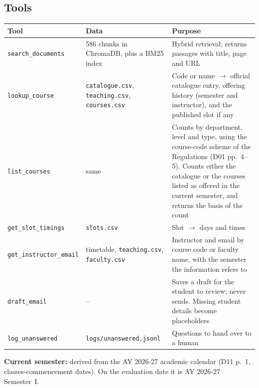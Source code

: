 \documentclass[11pt,a4paper]{article}
\newcommand{\code}[1]{\texttt{#1}}
\begin{document}
\subsection{Tools}
\begin{tabularx}{\textwidth}{@{}lp{3.4cm}Y@{}}
\toprule
Tool & Data & Purpose \\ \midrule
\code{search\_documents} & 586 chunks in ChromaDB, plus a BM25 index & Hybrid retrieval; returns passages with title, page and URL \\
\code{lookup\_course} & \code{catalogue.csv}, \code{teaching.csv}, \code{courses.csv} & Code or name $\rightarrow$ official catalogue entry, offering history (semester and instructor), and the published slot if any \\
\code{list\_courses} & same & Counts by department, level and type, using the course-code scheme of the Regulations (D01 pp.~4--5). Counts either the catalogue or the courses listed as offered in the current semester, and returns the basis of the count \\
\code{get\_slot\_timings} & \code{slots.csv} & Slot $\rightarrow$ days and times \\
\code{get\_instructor\_email} & timetable, \code{teaching.csv}, \code{faculty.csv} & Instructor and email by course code or faculty name, with the semester the information refers to \\
\code{draft\_email} & -- & Saves a draft for the student to review; never sends. Missing student details become placeholders \\
\code{log\_unanswered} & \code{logs/unanswered.jsonl} & Questions to hand over to a human \\
\bottomrule
\end{tabularx}

\medskip
\noindent\textbf{Current semester:} derived from the AY 2026-27 academic calendar (D11 p.~1, classes-commencement
dates). On the evaluation date it is AY 2026-27 Semester~I.
\end{document}
